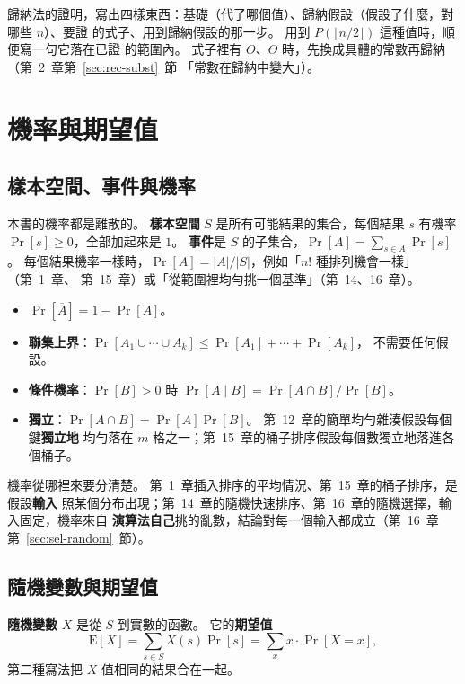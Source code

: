 \begin{examnote}
歸納法的證明，寫出四樣東西：基礎（代了哪個值）、歸納假設（假設了什麼，對哪些 $n$）、要證
的式子、用到歸納假設的那一步。 用到 $P(\lfloor n/2 \rfloor)$ 這種值時，順便寫一句它落在已證
的範圍內。 式子裡有 $O$、$\Theta$ 時，先換成具體的常數再歸納（第~2~章第~\ref{sec:rec-subst}~節
「常數在歸納中變大」）。
\end{examnote}

\section{機率與期望值}
\label{sec:mth-prob}

\subsection{樣本空間、事件與機率}

本書的機率都是離散的。 \textbf{樣本空間} $S$ 是所有可能結果的集合，每個結果 $s$ 有機率
$\Pr[s] \ge 0$，全部加起來是 $1$。 \textbf{事件}是 $S$ 的子集合，$\Pr[A] = \sum_{s \in A}
\Pr[s]$。 每個結果機率一樣時，$\Pr[A] = |A| / |S|$，例如「$n!$ 種排列機會一樣」（第~1~章、
第~15~章）或「從範圍裡均勻挑一個基準」（第~14、16~章）。

\begin{itemize}
\item $\Pr[\overline{A}] = 1 - \Pr[A]$。
\item \textbf{聯集上界}：$\Pr[A_1 \cup \cdots \cup A_k] \le \Pr[A_1] + \cdots + \Pr[A_k]$，
不需要任何假設。
\item \textbf{條件機率}：$\Pr[B] > 0$ 時 $\Pr[A \mid B] = \Pr[A \cap B] / \Pr[B]$。
\item \textbf{獨立}：$\Pr[A \cap B] = \Pr[A]\Pr[B]$。 第~12~章的簡單均勻雜湊假設每個鍵\textbf{獨立地}
均勻落在 $m$ 格之一；第~15~章的桶子排序假設每個數獨立地落進各個桶子。 
\end{itemize}

機率從哪裡來要分清楚。 第~1~章插入排序的平均情況、第~15~章的桶子排序，是假設\textbf{輸入}
照某個分布出現；第~14~章的隨機快速排序、第~16~章的隨機選擇，輸入固定，機率來自
\textbf{演算法自己}挑的亂數，結論對每一個輸入都成立（第~16~章第~\ref{sec:sel-random}~節）。

\subsection{隨機變數與期望值}

\textbf{隨機變數} $X$ 是從 $S$ 到實數的函數。 它的\textbf{期望值}
\[
\mathrm{E}[X] = \sum_{s \in S} X(s) \Pr[s] = \sum_{x} x \cdot \Pr[X = x],
\]
第二種寫法把 $X$ 值相同的結果合在一起。

